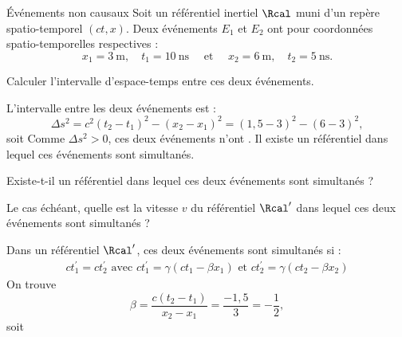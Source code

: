 \begin{exo}[PC][1][appli]{Événements non causaux}
  \hauteurLargeurCadreReponse{8mm}{\textwidth}
  Soit un référentiel inertiel $\Rcal$ muni d’un repère spatio-temporel $(ct,x)$.
Deux événements $E_1$ et $E_2$ ont pour coordonnées spatio-temporelles respectives : 
\begin{equation}
  x_1=3 \mathrm{~m}, \quad t_1=10 \mathrm{~ns} \quad \text{ et }\quad x_2=6 \mathrm{~m}, \quad t_2=5 \mathrm{~ns}.
\end{equation}
  \begin{enonce}
    Calculer l'intervalle d’espace-temps  entre ces deux événements. 

  \end{enonce}

  \begin{corrige}
    
    L'intervalle entre les deux événements est :
    $$
    \Delta s^2=c^2\left(t_2-t_1\right)^2-\left(x_2-x_1\right)^2=(1,5-3)^2-(6-3)^2,
    $$
    soit 
      Comme $\Delta s^2>0$, ces deux événements n'ont . Il existe un référentiel dans lequel ces événements sont simultanés.
    \end{corrige}

Existe-t-il un référentiel dans lequel ces deux événements sont simultanés ? 

    \begin{enonce}
    Le cas échéant, quelle est la vitesse $v$ du référentiel $\Rcal^{\prime}$ dans lequel ces deux événements sont simultanés ?

    \end{enonce}
    \begin{corrige}
      
      Dans un référentiel $\Rcal^{\prime}$, ces deux événements sont simultanés si :
      $$
    \begin{gathered}
      c t_1^{\prime}=c t_2^{\prime} \text { avec } c t_1^{\prime}=\gamma\left(c t_1-\beta x_1\right) \text { et } c t_2^{\prime}=\gamma\left(c t_2-\beta x_2\right) 
    \end{gathered}
    $$
    On trouve
    $$\beta=\frac{c\left(t_2-t_1\right)}{x_2-x_1}=\frac{-1,5}{3}=-\frac{1}{2} ,$$
    soit 
    \end{corrige}



\end{exo}
